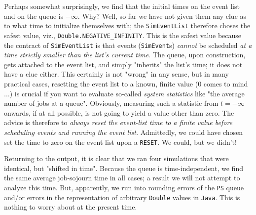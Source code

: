 \documentclass[12pt]{book}
\begin{document}
Perhaps somewhat surprisingly,
  we find that the initial times on the event list
  and on the queue is $-\infty$.
Why? Well, so far we have not given them any clue as to
  what time to initialize themselves with;
  the \lstinline|SimEventList| therefore
  choses the safest value, viz., \lstinline|Double.NEGATIVE_INFINITY|.
This is the safest value
  because the contract of \lstinline|SimEventList| is that
  events (\lstinline|SimEvent|s) {\em cannot\/}
  be scheduled {\em at a time strictly smaller than the list's current time}.
The queue, upon construction, gets attached to the event list,
  and simply "inherits" the list's time;
  it does not have a clue either.
This certainly is not "wrong" in any sense,
  but in many practical cases,
  resetting the event list to a
  known, finite value ($0$ comes to mind$\ldots$)
  is crucial if you want to evaluate
  so-called {\em system statistics}
  like "the average number of jobs at a queue".
Obviously, measuring such a statistic from $t=-\infty$ onwards,
  if at all possible,
  is not going to yield a value other than zero.
The advice is therefore to
  {\em always reset the event-list time to a finite value
       before scheduling events and running the event list.}
Admittedly, we could have chosen set the time to zero
  on the event list upon a \lstinline|RESET|.
We could, but we didn't!

Returning to the output,
  it is clear that we ran four simulations
  that were identical, but "shifted in time".
Because the queue is time-independent,
  we find the same average job-sojourn time
  in all cases;
  a result we will not attempt to analyze this time.
But,
  apparently,
  we run into rounding errors of the \lstinline|PS| queue
  and/or errors in the representation of
  arbitrary \lstinline|Double| values in \lstinline|Java|.
This is nothing to worry about at the present time.
\end{document}

